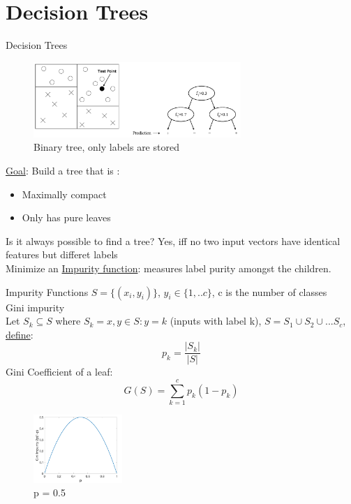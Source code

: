 \documentclass[aspectratio=1610]{beamer}
\begin{document}
\section{Decision Trees}
\begin{frame}{Decision Trees}
    \begin{figure}[h!]
  \includegraphics[width=0.7\textwidth]{Screen Shot 2022-06-24 at 22.57.21.png}
  \caption{Binary tree, only labels are stored}
\end{figure}
\underline{Goal}: Build a tree that is : \begin{itemize}
    \item Maximally compact
    \item Only has pure leaves
\end{itemize}
Is it always possible to find a tree? Yes, iff no two input vectors have identical features but differet labels\\
Minimize an \underline{Impurity function}: measures label purity amongst the children.

\end{frame}
\begin{frame}{Impurity Functions}
$S = \{(x_i, y_i)\}$, $y_i \in \{1, ..c\}$, c is the number of classes\\
Gini impurity\\
Let $S_k \subseteq S$ where $S_k = {x,y}\in S: y = k$ (inputs with label k), $S = S_1\cup S_2 \cup ... S_c$, \underline{define}:\\
$$p_k = \frac{|S_k|}{|S|}$$
Gini Coefficient of a leaf:
$$G(S) = \sum_{k=1}^{c} p_k(1-p_k)$$

 \begin{figure}[h!]
  \includegraphics[width=0.3\textwidth]{Screen Shot 2022-06-24 at 23.14.55.png}
  \caption{p = 0.5}
\end{figure}
\end{frame}
\end{document}
